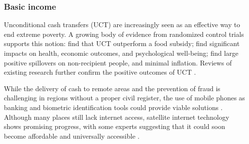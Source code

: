 
\subsubsection{Basic income}\label{subsubsec:literature_basic_income}

Unconditional cash transfers (UCT) are increasingly seen as an effective way to end extreme poverty. A growing body of evidence from randomized control trials supports this notion: \citet{gangopadhyay_cash_2015} find that UCT outperform a food subsidy; \citet{haushofer_short-term_2016} find significant impacts on health, economic outcomes, and psychological well-being; \citet{egger_general_2022} find large positive spillovers on non-recipient people, and minimal inflation. 
Reviews of existing research further confirm the positive outcomes of UCT \citep{standing_little_2014,bastagli_cash_2016}. %

While the delivery of cash to remote areas and the prevention of fraud is challenging in regions without a proper civil register, the use of mobile phones as banking and biometric identification tools could provide viable solutions \citep{harnett_taking_2017}. Although many places still lack internet access, satellite internet technology shows promising progress, with some experts suggesting that it could soon become affordable and universally accessible \citep{hanson_satellite_2016}.

